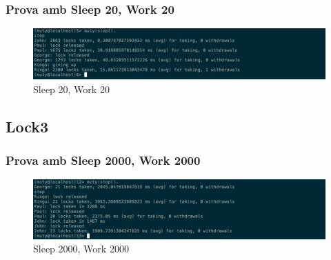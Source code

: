 \documentclass[a4paper, 11pt]{article}
\begin{document}
\subsubsection{Prova amb Sleep 20, Work 20}

\begin{figure}[H]
    \centering
    \includegraphics[width=1.0\textwidth]{figures/20-20lock2}
    \caption{Sleep 20, Work 20 \label{fig:20-20lock2}}    
\end{figure}

\subsection{Lock3}

\subsubsection{Prova amb Sleep 2000, Work 2000}

\begin{figure}[H]
    \centering
    \includegraphics[width=1.0\textwidth]{figures/2000-2000lock3}
    \caption{Sleep 2000, Work 2000 \label{fig:2000-2000lock3}}    
\end{figure}
\end{document}
